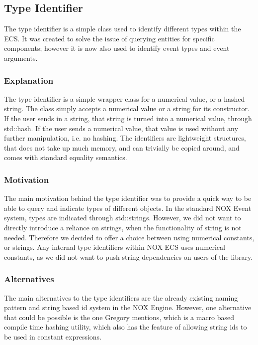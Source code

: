 \subsection{Type Identifier}
\label{subsec:detailed_type_identifier}

The type identifier is a simple class used to identify different types within
the ECS.
It was created to solve the issue of querying entities for specific components; however it is now also used to identify event types and event arguments.

\subsubsection{Explanation}
The type identifier is a simple wrapper class for a numerical value, or a hashed string.
The class simply accepts a numerical value or a string for its constructor.
If the user sends in a string, that string is turned into a numerical value, through std::hash. If the user sends a numerical value, that value is used without any further manipulation, i.e. no hashing.
The identifiers are lightweight structures, that does not take up much memory, and can trivially be copied around, and comes with standard equality semantics.

\subsubsection{Motivation}
The main motivation behind the type identifier was to provide a quick
way to be able to query and indicate types of different objects.
In the standard NOX Event system, types are indicated through std::strings.
However, we did not want to directly introduce a reliance on strings, when the functionality of string is not needed.
Therefore we decided to offer a choice between using numerical constants, or strings.
Any internal type identifiers within NOX ECS uses numerical constants, as we did not want to push string dependencies on users of the library.

\subsubsection{Alternatives}
The main alternatives to the type identifiers are the already existing
naming pattern and string based id system in the NOX Engine.
However, one alternative that could be possible is the one Gregory\cite[p. 276]{game_engine_architecture}
mentions, which is a macro based compile time hashing utility,
which also has the feature of allowing string ids to be used in constant expressions.

